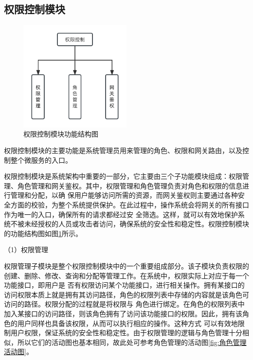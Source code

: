 
\subsection{权限控制模块}

\begin{figure}[h]
    \centering
    \includegraphics[width=0.5\textwidth]{my_figures/chapter4/权限控制模块功能结构图.png}
    \caption{权限控制模块功能结构图}
    \label{fig:权限控制模块功能结构图}
\end{figure}

权限控制模块的主要功能是系统管理员用来管理的角色、权限和网关路由，以及控制整个微服务的入口。

权限控制模块是系统架构中重要的一部分，它主要由三个子功能模块组成：权限管理、角色管理和网关鉴权。其中，权限管理和角色管理负责对角色和权限的信息进行管理和分配，以确
保用户能够访问所需的资源，而网关鉴权则主要通过各种安全方面的校验，为整个系统提供保护。在此过程中，操作系统会将网关的所有接口作为唯一的入口，确保所有的请求都经过安
全筛选。这样，就可以有效地保护系统不被未经授权的人员或攻击者访问，确保系统的安全性和稳定性。权限控制模块的功能结构图如图\ref{fig:权限控制模块功能结构图}所示。




（1）权限管理

权限管理子模块是整个权限控制模块中的一个重要组成部分。该子模块负责权限的创建、删除、修改、查询和分配等管理工作。在系统中，权限实际上对应于每一个功能接口，即用户是
否有权限访问某个功能接口，进行相关操作。拥有某接口的访问权限本质上就是拥有其访问路径，角色的权限列表中存储的内容就是该角色可访问的路径。权限分配的过程就是将权限与
角色进行绑定。在角色的权限列表中加入某接口的访问路径，则该角色拥有了访问该功能接口的权限。因此，拥有该角色的用户同样也具备该权限，从而可以执行相应的操作。这种方式
可以有效地限制用户权限，保证系统的安全性和稳定性。由于权限管理的逻辑与角色管理十分相似，所以它们的活动图也基本相同，故此处可参考角色管理的活动图\ref{fig:角色管理活动图}。

